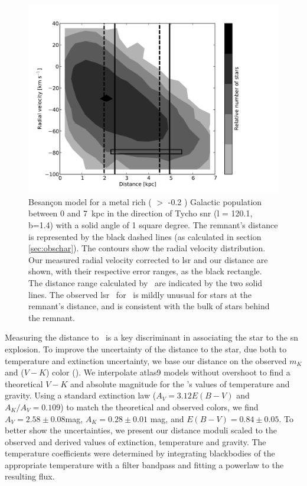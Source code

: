 \begin{figure}[tb]
\centering
\includegraphics* [width=1\textwidth,angle=0, trim=0 0 3cm 0, clip]{chapter_sn1572_starg/plots/sn1572_d_vr_subaru.pdf}
\caption[Radial velocity of Tycho-G compared with the Besan\c{c}on Model]{Besan\c{c}on model for a metal rich ( $>$ -0.2 ) Galactic population between 0 and 7~kpc in the direction of Tycho \gls{snr} (l = 120.1, b=1.4) with a solid angle of 1 square degree.
The remnant's distance is represented by the black dashed lines (as calculated in section \ref{sec:obschar}). The contours show the radial velocity distribution. 
Our measured radial velocity corrected to \gls{lsr} and our distance are shown, with their respective error ranges, as the black rectangle.  The distance  range calculated by \gh\ are indicated by the two solid lines. The observed \gls{lsr} \vrad\ for \starg\ is mildly unusual for stars at the remnant's distance, and is consistent with the bulk of stars behind
the remnant. }
\label{fig:bes_d_mu}
\end{figure}

Measuring the distance to \starg\ is a key discriminant in associating the star to the \gls*{sn} explosion. To improve the uncertainty of the distance to the star, due both to temperature and extinction uncertainty,  we base our distance on the observed $m_K$ \citep{2006AJ....131.1163S} and ($V-K$) color (\rl).  We interpolate \gls{atlas9} models without overshoot \citep{1998A&A...333..231B} to find a theoretical $V-K$ and absolute magnitude for the \gh's values of temperature and gravity. Using a standard extinction law \citep*{1989ApJ...345..245C} ($A_V= 3.12 E(B-V)$ and $A_K/A_V=0.109$) to match the theoretical and observed colors, we find $A_V=2.58\pm0.08$mag, $A_K=0.28\pm 0.01$ mag, and $E(B-V)=0.84\pm0.05$.  To better show the uncertainties, we present our distance moduli scaled to the observed and derived values of extinction, temperature and gravity.
The temperature coefficients were determined by integrating blackbodies of the appropriate temperature with a filter bandpass and fitting a powerlaw to the resulting flux. \label{sec:distmod}
 
